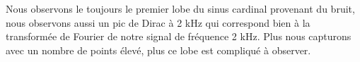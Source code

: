 \documentclass[oneside,a4paper,12pt]{article}
\begin{document}
	Nous observons le toujours le premier lobe du sinus cardinal provenant du bruit, nous observons aussi un pic de Dirac à 2 kHz qui correspond bien à la transformée de Fourier de notre signal de fréquence 2 kHz. Plus nous capturons avec un nombre de points élevé, plus ce lobe est compliqué à observer. 
\end{document}
